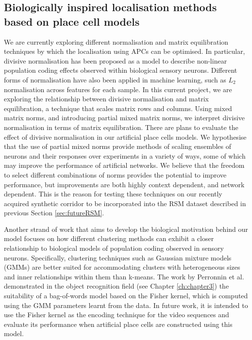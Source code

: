 \subsection{Biologically inspired localisation methods based on place cell models}

We are currently exploring different normalisation and matrix equilibration techniques by which the localisation using APCs can be optimised. In particular, divisive normalisation has been proposed as a model to describe non-linear population coding effects observed within biological sensory neurons. Different forms of normalisation have also been applied in machine learning, such as $L_2$ normalisation across features for each sample. In this current project, we are exploring the relationship between divisive normalisation and matrix equilibration, a technique that scales matrix rows and columns. Using mixed matrix norms, and introducing partial mixed matrix norms, we interpret divisive normalisation in terms of matrix equilibration. There are plans to evaluate the effect of divisive normalisation in our artificial place cells models. We hypothesise that the use of partial mixed norms provide methods of scaling ensembles of neurons and their responses over experiments in a variety of ways, some of which may improve the performance of artificial networks. We believe that the freedom to select different combinations of norms provides the potential to improve performance, but improvements are both highly context dependent, and network dependent. This is the reason for testing these techniques on our recently acquired synthetic corridor to be incorporated into the RSM dataset described in previous Section \ref{sec:futureRSM}.


Another strand of work that aims to develop the biological motivation behind our model focuses on how different clustering methods can exhibit a closer relationship to biological models of population coding observed in sensory neurons. Specifically, clustering techniques such as Gaussian mixture models (GMMs) are better suited for accommodating clusters with heterogeneous sizes and inner relationships within them than k-means. The work by Perronnin et al. \cite{ perronnin2007fisher, Perronnin2010, Jegou2012} demonstrated in the object recognition field (see Chapter \ref{ch:chapter3}) the suitability of a bag-of-words model based on the Fisher kernel, which is computed using the GMM parameters learnt from the data. In future work, it is intended to use the Fisher kernel as the encoding technique for the video sequences and evaluate its performance when artificial place cells are constructed using this model.

